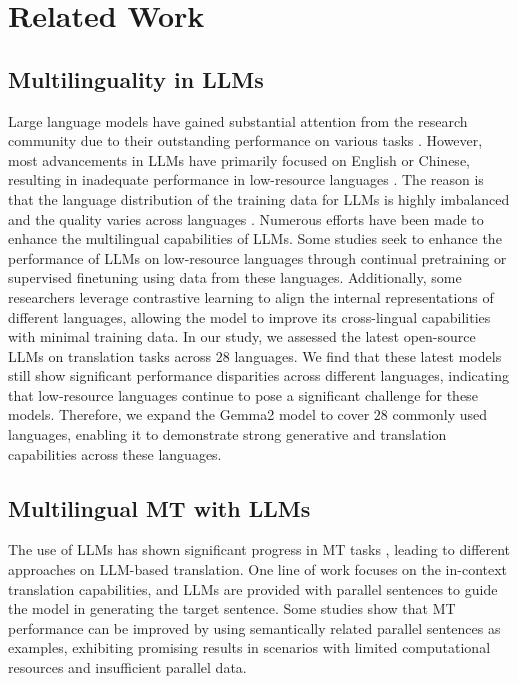 \section{Related Work}
\subsection{Multilinguality in LLMs}

Large language models have gained substantial attention from the research community due to their outstanding performance on various tasks \cite{winata-etal-2021-language,wei2022emergentabilitieslargelanguage,touvron2023llamaopenefficientfoundation}. However, most advancements in LLMs have primarily focused on English or Chinese, resulting in inadequate performance in low-resource languages \cite{ebrahimi-etal-2022-americasnli,asai-etal-2024-buffet}. The reason is that the language distribution of the training data for LLMs is highly imbalanced and the quality varies across languages \cite{ding-etal-2024-data}. Numerous efforts have been made to enhance the multilingual capabilities of LLMs. Some studies seek to enhance the performance of LLMs on low-resource languages through continual pretraining \cite{cui2024efficienteffectivetextencoding} or supervised finetuning \cite{ustun-etal-2024-aya} using data from these languages. Additionally, some researchers \cite{li-etal-2024-improving-context} leverage contrastive learning to align the internal representations of different languages, allowing the model to improve its cross-lingual capabilities with minimal training data. In our study, we assessed the latest open-source LLMs on translation tasks across $28$ languages. We find that these latest models still show significant performance disparities across different languages, indicating that low-resource languages continue to pose a significant challenge for these models. Therefore, we expand the Gemma2 model to cover $28$ commonly used languages, enabling it to demonstrate strong generative and translation capabilities across these languages.

\subsection{Multilingual MT with LLMs}

The use of LLMs has shown significant progress in MT tasks \cite{lu2024llamaxscalinglinguistichorizons,DBLP:conf/icml/XuSCTSDM024,li-etal-2024-eliciting,gao2024boostingmanytomanymultilingualmachine}, leading to different approaches on LLM-based translation. One line of work focuses on the in-context translation capabilities, and LLMs are provided with parallel sentences to guide the model in generating the target sentence. Some studies \cite{agrawal-etal-2023-context,zhu-etal-2024-towards-robust,cui-etal-2024-efficiently} show that MT performance can be improved by using semantically related parallel sentences as examples, exhibiting promising results in scenarios with limited computational resources and insufficient parallel data.

